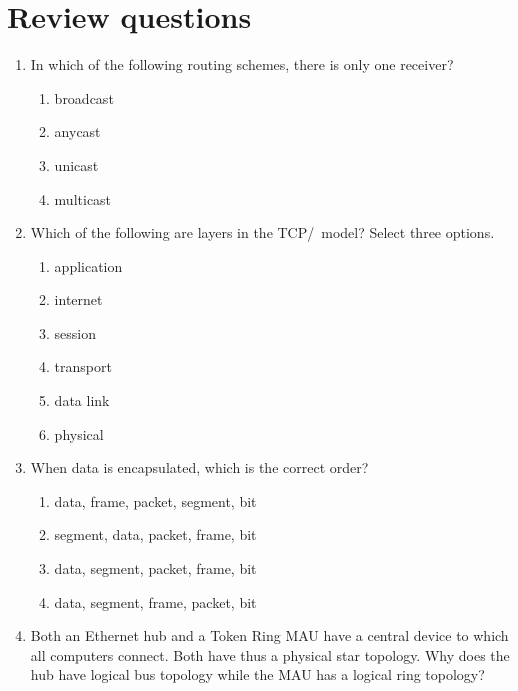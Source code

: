 \section{Review questions}
\begin{enumerate}
\item
   In which of the following routing schemes, there is only one receiver?
   \begin{multicols}{2}
   \begin{enumerate}
   \item broadcast
   \item anycast
   \item unicast
   \item multicast
   \end{enumerate}
   \end{multicols}
\item
   Which of the following are layers in the \acs{TCP}/\IP\ model?
   Select three options.
   \begin{multicols}{2}
   \begin{enumerate}
   \item application
   \item internet
   \item session
   \item transport
   \item data link
   \item physical
   \end{enumerate}
   \end{multicols}
\item
   When data is encapsulated, which is the correct order?
   \begin{enumerate}
   \item data, frame, packet, segment, bit
   \item segment, data, packet, frame, bit
   \item data, segment, packet, frame, bit
   \item data, segment, frame, packet, bit
   \end{enumerate}
\item
   Both an Ethernet hub and a Token Ring \acs{MAU} have a central device to which all computers connect.
   Both have thus a physical star topology.
   Why does the hub have logical bus topology while the \acs{MAU} has a logical ring topology?
\end{enumerate}

